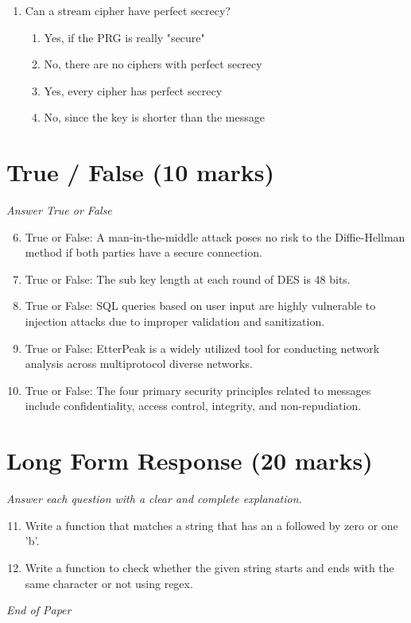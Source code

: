 \documentclass[12pt]{article}
\begin{document}
\begin{enumerate}[label=\arabic*.]
\begin{enumerate}[label=(\alph*)]
    \item Remove a subset of the constraints and retry the query.
\end{enumerate}
\item Can a stream cipher have perfect secrecy?
\begin{enumerate}[label=(\alph*)]
    \item Yes, if the PRG is really "secure"
    \item No, there are no ciphers with perfect secrecy
    \item Yes, every cipher has perfect secrecy
    \item No, since the key is shorter than the message
\end{enumerate}
\end{enumerate}

\section*{True / False (10 marks)}
\textit{Answer True or False}
\begin{enumerate}[label=\arabic*.]
\setcounter{enumi}{5}
\item True or False: A man-in-the-middle attack poses no risk to the Diffie-Hellman method if both parties have a secure connection.
\item True or False: The sub key length at each round of DES is 48 bits.
\item True or False: SQL queries based on user input are highly vulnerable to injection attacks due to improper validation and sanitization.
\item True or False: EtterPeak is a widely utilized tool for conducting network analysis across multiprotocol diverse networks.
\item True or False: The four primary security principles related to messages include confidentiality, access control, integrity, and non-repudiation.
\end{enumerate}

\section*{Long Form Response (20 marks)}
\textit{Answer each question with a clear and complete explanation.}
\begin{enumerate}[label=\arabic*.]
\setcounter{enumi}{10}
\item Write a function that matches a string that has an a followed by zero or one 'b'.
\item Write a function to check whether the given string starts and ends with the same character or not using regex.
\end{enumerate}

\vfill
\noindent\textit{End of Paper}
\end{document}
